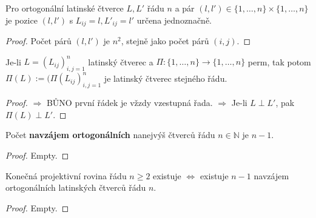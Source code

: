 \begin{pozor}
	Pro ortogonální latinské čtverce $L, L'$ řádu $n$ a pár $(l,l') \in \{ 1, \dots , n\} \times \{ 1, \dots , n\}$ je pozice $(l,l')$ s $L_{ij}=l, L'_{ij}=l'$ určena jednoznačně.
\end{pozor}

\begin{proof}
	Počet párů $(l,l')$ je $n^{2}$, stejně jako počet párů $(i,j)$.
\end{proof}

\begin{pozor}
	Je-li $L = (L_{ij})_{i,j = 1}^n$ latinský čtverec a $\Pi : \{ 1, \dots , n\} \to \{ 1, \dots , n \}$ perm, tak potom $\Pi (L) := (\Pi (L_{ij})_{i,j =1}^n$ je latinský čtverec stejného řádu.
\end{pozor}

\begin{proof}
	$\Rightarrow$ BŮNO první řádek je vžzdy vzestupná řada. $\Rightarrow$ Je-li $L \perp L'$, pak $\Pi (L) \perp L'$.
\end{proof}

\begin{dusl}
	Počet \textbf{navzájem ortogonálních} nanejvýš čtverců řádu $n \in \mathbb{N}$ je $n-1$.
\end{dusl}

\begin{proof}
	Empty.
\end{proof}

\begin{veta}
	Konečná projektivní rovina řádu $n \geq 2$ existuje $\Leftrightarrow$ existuje $n-1$ navzájem ortogonálních latinských čtverců řádu $n$.
\end{veta}

\begin{proof}
	Empty.
\end{proof}
